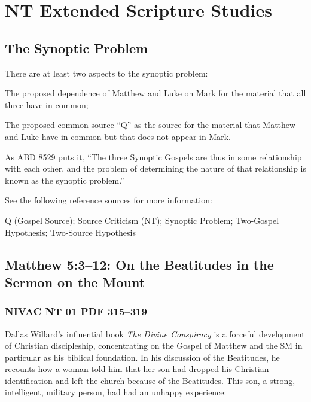 \section{NT Extended Scripture Studies}
	\label{EXSS-NT}
	
	\subsection{The Synoptic Problem}
		\label{EXSS-NT-SYNOPTIC}
		
		There are at least two aspects to the synoptic problem:
		
			\begin{compactitem}
				\item The proposed dependence of Matthew and Luke on Mark for the material that all three have in common;
				\item The proposed common-source ``Q'' as the source for the material that Matthew and Luke have in common but that does not appear in Mark.
			\end{compactitem}
			
		As ABD 8529 puts it, ``The three Synoptic Gospels are thus in some relationship with each other, and the problem of determining the nature of that relationship is known as the synoptic problem.''
			
		See the following reference sources for more information:
		
			\begin{compactdesc}
				\item[ABD] Q (Gospel Source); Source Criticism (NT); Synoptic Problem; Two-Gospel Hypothesis; Two-Source Hypothesis
			\end{compactdesc}
	
	\subsection{Matthew 5:3--12: On the Beatitudes in the Sermon on the Mount}
		\label{EXSS-NT-BEATITUDE}
	
		\subsubsection{NIVAC NT 01 PDF 315--319}
		
			Dallas Willard's influential book \textit{The Divine Conspiracy} is a forceful development of Christian discipleship, concentrating on the Gospel of Matthew and the SM in particular as his biblical foundation. In his discussion of the Beatitudes, he recounts how a woman told him that her son had dropped his Christian identification and left the church because of the Beatitudes. This son, a strong, intelligent, military person, had had an unhappy experience: 
		
